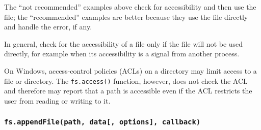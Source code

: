 \begin{Shaded}
\begin{Highlighting}[]
\OperatorTok{,} \OperatorTok{;}

\NormalTok{(}\OperatorTok{,} \OperatorTok{,}\OperatorTok{,}\KeywordTok{=\textgreater{}}\NormalTok{ \{}
     \OperatorTok{===} \NormalTok{) \{}
      \NormalTok{(}\NormalTok{)}\OperatorTok{;}
      \OperatorTok{;}
\NormalTok{    \}}

    \OperatorTok{;}
\NormalTok{  \}}

  \NormalTok{ \{}
    \OperatorTok{;}
\NormalTok{  \} }\NormalTok{ \{}
    \OperatorTok{,}\KeywordTok{=\textgreater{}}\NormalTok{ \{}
      \OperatorTok{;}
\NormalTok{    \})}\OperatorTok{;}
\NormalTok{  \}}
\NormalTok{\})}\OperatorTok{;}
\end{Highlighting}
\end{Shaded}

The ``not recommended'' examples above check for accessibility and then
use the file; the ``recommended'' examples are better because they use
the file directly and handle the error, if any.

In general, check for the accessibility of a file only if the file will
not be used directly, for example when its accessibility is a signal
from another process.

On Windows, access-control policies (ACLs) on a directory may limit
access to a file or directory. The \texttt{fs.access()} function,
however, does not check the ACL and therefore may report that a path is
accessible even if the ACL restricts the user from reading or writing to
it.

\subsubsection{\texorpdfstring{\texttt{fs.appendFile(path,\ data{[},\ options{]},\ callback)}}{fs.appendFile(path, data{[}, options{]}, callback)}}\label{fs.appendfilepath-data-options-callback}

